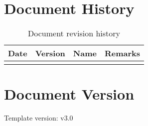 \pagebreak

\section*{Document History}
\label{section:DocumentHistory}

\begin{table}[h]
	\begin{tabularx}{\textwidth}{|p{2.5cm}|l|l|X|} \hline
		\rowcolor{grey230} \bf{Date} & \bf{Version} & \bf{Name} & \bf{Remarks} \\[3pt] \hline 
			\ReportDocumentHistory			
	\end{tabularx}
\label{table:DocumentRevisionHistory}
\caption{Document revision history}
\end{table}

\medskip
\par
\noindent

\section*{Document Version}
\label{section:DocumentVersion}
Template version: v3.0

\vfill